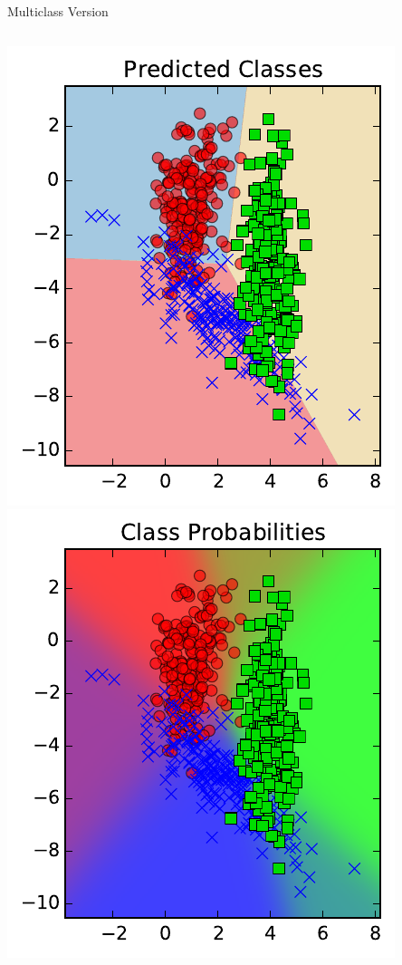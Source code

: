 \documentclass[10pt, aspectratio=169]{beamer} %
\begin{document}
\begin{frame}[fragile]{Multiclass Version }
\begin{columns}[onlytextwidth]
\begin{center}
	\includegraphics[width=\textwidth]{LR_3classes.pdf}\\
	\includegraphics[width=\textwidth]{LR_3classes_prob.pdf}\\
\end{center}
\end{columns}
\end{frame}
\end{document}
